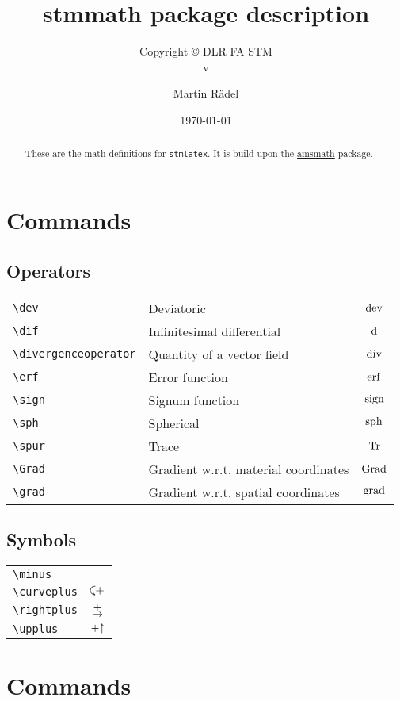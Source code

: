 \documentclass{scrartcl}
\author{Martin R\"{a}del}
\title{stmmath package description}
\subtitle{Copyright \copyright{} \the\year{} DLR FA STM\\v\formatdate[versiondatestyle]{\DTMToday}}
\date{\today}
\begin{document}
\maketitle

\begin{abstract}
These are the math definitions for \texttt{stmlatex}. It is build upon the \href{https://ctan.org/pkg/amsmath}{amsmath} package.
\end{abstract}

\tableofcontents

\section{Commands}

\subsection{Operators}

\begin{tabularx}{\linewidth}{lXc}
\verb+\dev+ & Deviatoric & $\operatorname{dev}$\\
\verb+\dif+ & Infinitesimal differential & $\mathop{}\!\mathrm{d}$\\
\verb+\divergenceoperator+ & Quantity of a vector field & $\operatorname{div}$\\
\verb+\erf+ & Error function & $\operatorname{erf}$\\
\verb+\sign+ & Signum function & $\operatorname{sign}$\\
\verb+\sph+ & Spherical & $\operatorname{sph}$\\
\verb+\spur+ & Trace & $\operatorname{Tr}$\\
\verb+\Grad+ & Gradient w.r.t. material coordinates & $\operatorname{Grad}$\\
\verb+\grad+ & Gradient w.r.t. spatial coordinates & $\operatorname{grad}$
\end{tabularx}

\subsection{Symbols}

\begin{tabularx}{\linewidth}{Xc}
\verb+\minus+ & $\minus$\\
\verb+\curveplus+ & $\curveplus$\\
\verb+\rightplus+ & $\rightplus$\\
\verb+\upplus+ & $\mathbin{+\mathord\uparrow}$
\end{tabularx}

\section{Commands}
\end{document}
